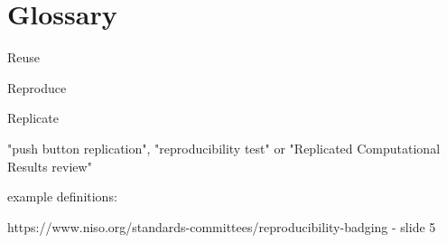 \section{Glossary}

Reuse

Reproduce

Replicate

"push button replication", "reproducibility test" or "Replicated Computational Results review"

example definitions:

https://www.niso.org/standards-committees/reproducibility-badging - slide 5